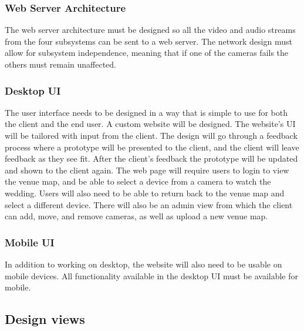 \documentclass[onecolumn, draftclsnofoot,10pt, compsoc]{IEEEtran}
\begin{document}
        \subsubsection{Web Server Architecture}
        The web server architecture must be designed so all the video and audio streams from the four subsystems can be sent to a web server. 
        The network design must allow for subsystem independence, meaning that if one of the cameras fails the others must remain unaffected.  
        
        \subsubsection{Desktop UI}
        The user interface needs to be designed in a way that is simple to use for both the client and the end user. 
        A custom website will be designed. The website's UI will be tailored with input from the client.  
        The design will go through a feedback process where a prototype will be presented to the client, and the client will leave feedback as they see fit. 
        After the client's feedback the prototype will be updated and shown to the client again. 
        The web page will require users to login to view the venue map, and be able to select a device from a camera to watch the wedding. 
        Users will also need to be able to return back to the venue map and select a different device. 
        There will also be an admin view from which the client can add, move, and remove cameras, as well as upload a new venue map.
        
        \subsubsection{Mobile UI}
        In addition to working on desktop, the website will also need to be usable on mobile devices. 
        All functionality available in the desktop UI must be available for mobile.
        
    \subsection{Design views}
\end{document}
